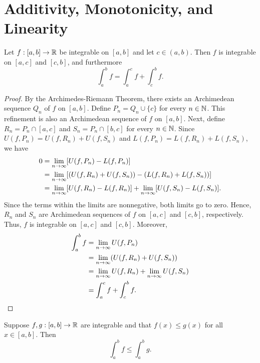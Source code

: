 \documentclass[letterpaper, twoside, 12pt]{book}
\begin{document}
\section{Additivity, Monotonicity, and Linearity}


\begin{theorem}
  Let \(f:[a,b]\to\mathbb R\) be integrable on \([a,b]\) and let \(c\in(a,b)\).
  Then \(f\) is integrable on \([a,c]\) and \([c,b]\), and furthermore
  \[
    \int_a^b f = \int_a^c f + \int_c^b f
  .\]
\end{theorem}

\begin{proof}
    By the Archimedes-Riemann Theorem, there exists an Archimedean sequence
    \(Q_n\) of \(f\) on \([a,b]\). Define \(P_n = Q_n \cup \{c\}\) for
    every \(n \in \mathbb N\). This refinement is also an Archimedean sequence
    of \(f\) on \([a,b]\). Next, define \(R_n = P_n \cap [a, c]\) and
    \(S_n = P_n \cap [b, c]\) for every \(n \in \mathbb N\). Since 
    \(U(f, P_n) = U(f, R_n) + U(f, S_n)\) and \(L(f, P_n) = L(f, R_n) + L(f, S_n)\),
    we have
    \begin{align*}
        0 &= \lim_{n \to \infty} [ U(f, P_n) - L(f, P_n) ] \\
          &= \lim_{n \to \infty} [ (U(f, R_n) + U(f, S_n)) - (L(f, R_n) + L(f, S_n)) ] \\
          &= \lim_{n \to \infty} [ U(f, R_n) - L(f, R_n) ] + \lim_{n \to \infty} [ U(f, S_n) - L(f, S_n) ] .\\
    \end{align*}
    Since the terms within the limits are nonnegative, both limits go 
    to zero. Hence, \(R_n\) and \(S_n\) are Archimedean sequences of \(f\)
    on \([a,c]\) and \([c, b]\), respectively. Thus, \(f\) is integrable
    on \([a,c]\) and \([c, b]\). Moreover,
    \begin{align*}
        \int_a^b f &= \lim_{n \to \infty} U(f, P_n) \\
                   &= \lim_{n \to \infty} (U(f, R_n) + U(f, S_n)) \\
                   &= \lim_{n \to \infty} U(f, R_n) + \lim_{n \to \infty} U(f, S_n) \\
                   &= \int_a^c f + \int_c^b f . \\
    \end{align*}
\end{proof}


\begin{theorem}
  Suppose \(f,g:[a,b]\to\mathbb R\) are integrable and that \(f(x)\leq g(x)\)
  for all \(x\in[a,b]\). Then
  \[
    \int_a^b f \leq \int_a^b g
  .\]
\end{theorem}
\end{document}

